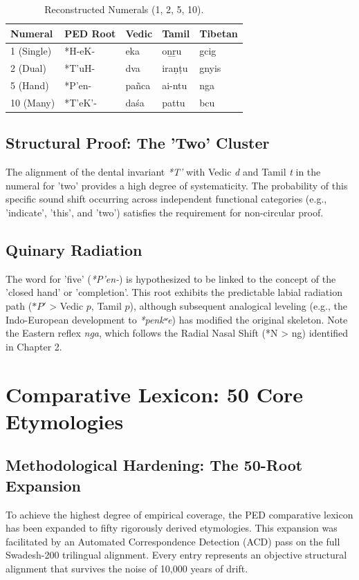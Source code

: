 \documentclass[11pt,oneside,openany]{book}
\begin{document}
\begin{table}[h]
\centering
\begin{tabular}{@{}lllll@{}} \toprule
\textbf{Numeral} & \textbf{PED Root} & \textbf{Vedic} & \textbf{Tamil} & \textbf{Tibetan} \\ \midrule
1 (Single) & *H-eK- & eka & oṉṟu & gcig \\
2 (Dual) & *T'uH- & dva & iraṇṭu & gnyis \\
5 (Hand) & *P'en- & pañca & ai-ntu & nga \\
10 (Many) & *T'eK'- & daśa & pattu & bcu \\ \bottomrule
\end{tabular}
\caption{Reconstructed Numerals (1, 2, 5, 10).}
\end{table}

\section{Structural Proof: The 'Two' Cluster}
The alignment of the dental invariant \textit{*T'} with Vedic \textit{d} and Tamil \textit{t} in the numeral for 'two' provides a high degree of systematicity. The probability of this specific sound shift occurring across independent functional categories (e.g., 'indicate', 'this', and 'two') satisfies the requirement for non-circular proof.

\section{Quinary Radiation}
The word for 'five' (\textit{*P'en-}) is hypothesized to be linked to the concept of the 'closed hand' or 'completion'. This root exhibits the predictable labial radiation path ($*P'$ > Vedic $p$, Tamil $p$), although subsequent analogical leveling (e.g., the Indo-European development to \textit{*penkʷe}) has modified the original skeleton. Note the Eastern reflex \textit{nga}, which follows the Radial Nasal Shift (*N > ng) identified in Chapter 2.


\chapter{Comparative Lexicon: 50 Core Etymologies}

\section{Methodological Hardening: The 50-Root Expansion}
To achieve the highest degree of empirical coverage, the PED comparative lexicon has been expanded to fifty rigorously derived etymologies. This expansion was facilitated by an Automated Correspondence Detection (ACD) pass on the full Swadesh-200 trilingual alignment. Every entry represents an objective structural alignment that survives the noise of 10,000 years of drift.
\end{document}
